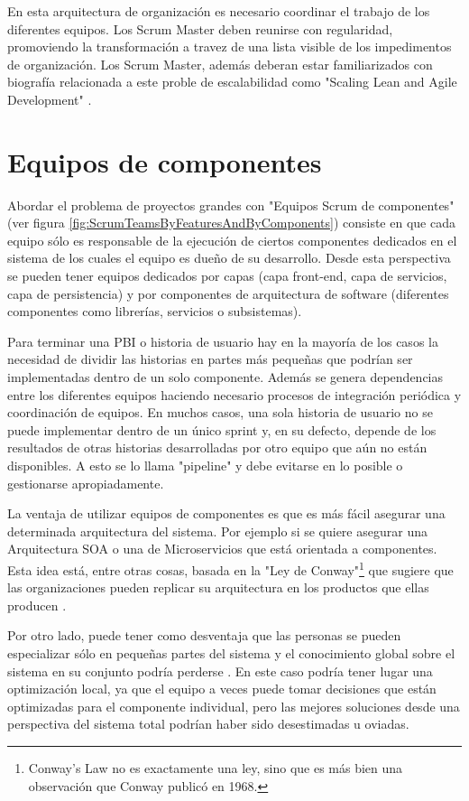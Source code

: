En esta arquitectura de organización es necesario coordinar el trabajo de los diferentes equipos. Los Scrum Master deben reunirse con regularidad, promoviendo la transformación a travez de una lista visible de los impedimentos de organización. Los Scrum Master, además deberan estar familiarizados con biografía relacionada a este proble de escalabilidad como "Scaling Lean and Agile Development" \cite{Larman-Vodde-2008}.

\section{Equipos de componentes}

Abordar el problema de proyectos grandes con "Equipos Scrum de componentes" (ver figura \ref{fig:ScrumTeamsByFeaturesAndByComponents}) consiste en que cada equipo sólo es responsable de la ejecución de ciertos componentes dedicados en el sistema de los cuales el equipo es dueño de su desarrollo. Desde esta perspectiva se pueden tener equipos dedicados por capas (capa front-end, capa de servicios, capa de persistencia) y por componentes de arquitectura de software (diferentes componentes como librerías, servicios o subsistemas).

Para terminar una PBI o historia de usuario hay en la mayoría de los casos la necesidad de dividir las historias en partes más pequeñas que podrían ser implementadas dentro de un solo componente. Además se genera dependencias entre los diferentes equipos haciendo necesario procesos de integración periódica y coordinación de equipos. En muchos casos, una sola historia de usuario no se puede implementar dentro de un único sprint y, en su defecto, depende de los resultados de otras historias desarrolladas por otro equipo que aún no están disponibles. A esto se lo llama "pipeline" y debe evitarse en lo posible o gestionarse apropiadamente.

La ventaja de utilizar equipos de componentes es que es más fácil asegurar una determinada arquitectura del sistema. Por ejemplo si se quiere asegurar una Arquitectura SOA o una de Microservicios que está orientada a componentes. Esta idea está, entre otras cosas, basada en la "Ley de Conway"\footnote{Conway's Law \cite{Conway-1968} no es exactamente una ley, sino que es más bien una observación que Conway publicó en 1968.} que sugiere que las organizaciones pueden replicar su arquitectura en los productos que ellas producen \cite{Martin-Fowler-2014}. 

Por otro lado, puede tener como desventaja que las personas se pueden especializar sólo en pequeñas partes del sistema y el conocimiento global sobre el sistema en su conjunto podría perderse \cite{Scrum-Institute-2015}. En este caso podría tener lugar una optimización local, ya que el equipo a veces puede tomar decisiones que están optimizadas para el componente individual, pero las mejores soluciones desde una perspectiva del sistema total podrían haber sido desestimadas u oviadas.

